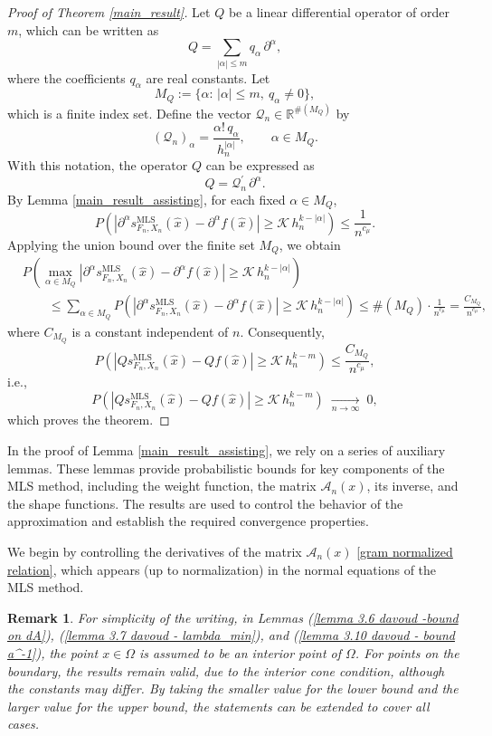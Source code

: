 \documentclass{article}
\newtheorem{remark}{Remark}
\newcommand{\mlsfunstoch}{s^\text{MLS}_{F_n,X_n}}
\begin{document}
\begin{proof}[Proof of \emph{\textit{Theorem} \ref{main_result}}]
Let $Q$ be a linear differential operator of order $m$, which can be written as
\[
Q=\sum_{|\alpha|\le m} q_\alpha\,\partial^\alpha,
\]
where the coefficients $q_\alpha$ are real constants. Let
\[
M_Q:=\{\alpha:\,|\alpha|\le m,\ q_\alpha\neq 0\},
\]
which is a finite index set.
Define the vector $\mathscr{Q}_n\in\mathbb{R}^{\#(M_Q)}$ by
\[
(\mathscr{Q}_n)_\alpha=\frac{\alpha!\,q_\alpha}{h_n^{|\alpha|}},
\qquad \alpha\in M_Q.
\]
With this notation, the operator $Q$ can be expressed as
\[
Q=\mathscr{Q}_n^{\prime}\,\partial^\alpha.
\]
By Lemma \ref{main_result_assisting}, for each fixed $\alpha\in M_Q$,
\[
P\!\left(\left|\partial^\alpha \mlsfunstoch(\hat{x})
-\partial^\alpha f(\hat{x})\right|
\ge \mathcal{K}\,h_n^{k-|\alpha|}\right) \leq \frac{1}{n^{c_\mu}}.
\]
Applying the union bound over the finite set $M_Q$, we obtain
\begin{align*}
&P\!\left(
\max_{\alpha\in M_Q}
\left|\partial^\alpha \mlsfunstoch(\hat{x})
-\partial^\alpha f(\hat{x})\right|
\ge \mathcal{K}\,h_n^{k-|\alpha|}
\right) \\
&\qquad\le
\sum_{\alpha\in M_Q}
P\!\left(\left|\partial^\alpha \mlsfunstoch(\hat{x})
-\partial^\alpha f(\hat{x})\right|
\ge \mathcal{K}\,h_n^{k-|\alpha|}\right)
\leq \#(M_Q)\cdot\frac{1}{n^{c_\mu}} =\frac{C_{M_Q}}{n^{c_\mu}},
\end{align*}
where $C_{M_Q}$ is a constant independent of $n$.
Consequently,
$$
P\!\left(\left|Q\mlsfunstoch(\hat{x})-Qf(\hat{x})\right|
\ge \mathcal{K}\,h_n^{k-m}\right)\leq \frac{C_{M_Q}}{n^{c_\mu}},
$$
i.e.,
\[
P\!\left(\left|Q\mlsfunstoch(\hat{x})-Qf(\hat{x})\right|
\ge \mathcal{K}\,h_n^{k-m}\right)
\;\xrightarrow[n\to\infty]{}\;0,
\]
which proves the theorem.
\end{proof}

In the proof of Lemma \ref{main_result_assisting}, we rely on a series of auxiliary lemmas. These lemmas provide probabilistic bounds for key components of the MLS method, including the weight function, the matrix $\mathscr{A}_n(x)$, its inverse, and the shape functions. The results are used to control the behavior of the approximation and establish the required convergence properties.

We begin by controlling the derivatives of the matrix $\mathscr{A}_n(x)$ \eqref{gram normalized relation}, which appears (up to normalization) in the normal equations of the MLS method.

\begin{remark}
    For simplicity of the writing, in Lemmas (\ref{lemma 3.6 davoud -bound on dA}), (\ref{lemma 3.7 davoud - lambda_min}), and (\ref{lemma 3.10 davoud - bound a^-1}), 
the point \( x \in \Omega \) is assumed to be an interior point of \( \Omega \). 
For points on the boundary, the results remain valid, due to the interior cone condition, although the constants may differ. 
By taking the smaller value for the lower bound and the larger value for the upper bound, 
the statements can be extended to cover all cases.
\end{remark}
\end{document}
